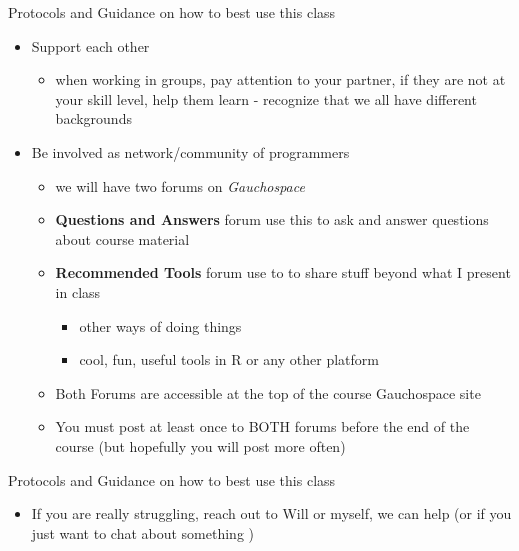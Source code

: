 \documentclass[
  ignorenonframetext,
]{beamer}
\providecommand{\tightlist}{%
  \setlength{\itemsep}{0pt}\setlength{\parskip}{0pt}}
\begin{document}
\begin{frame}{Protocols and Guidance on how to best use this class}
\protect\hypertarget{protocols-and-guidance-on-how-to-best-use-this-class-1}{}

\begin{itemize}
\tightlist
\item
  Support each other

  \begin{itemize}
  \tightlist
  \item
    when working in groups, pay attention to your partner, if they are
    not at your skill level, help them learn - recognize that we all
    have different backgrounds
  \end{itemize}
\item
  Be involved as network/community of programmers

  \begin{itemize}
  \item
    we will have two forums on \emph{Gauchospace}
  \item
    \textbf{Questions and Answers} forum use this to ask and answer
    questions about course material
  \item
    \textbf{Recommended Tools} forum use to to share stuff beyond what I
    present in class

    \begin{itemize}
    \tightlist
    \item
      other ways of doing things
    \item
      cool, fun, useful tools in R or any other platform
    \end{itemize}
  \item
    Both Forums are accessible at the top of the course Gauchospace site
  \item
    You must post at least once to BOTH forums before the end of the
    course (but hopefully you will post more often)
  \end{itemize}
\end{itemize}

\end{frame}

\begin{frame}{Protocols and Guidance on how to best use this class}
\protect\hypertarget{protocols-and-guidance-on-how-to-best-use-this-class-2}{}

\begin{itemize}
\tightlist
\item
  If you are really struggling, reach out to Will or myself, we can help
  (or if you just want to chat about something )
\end{itemize}

\end{frame}
\end{document}
